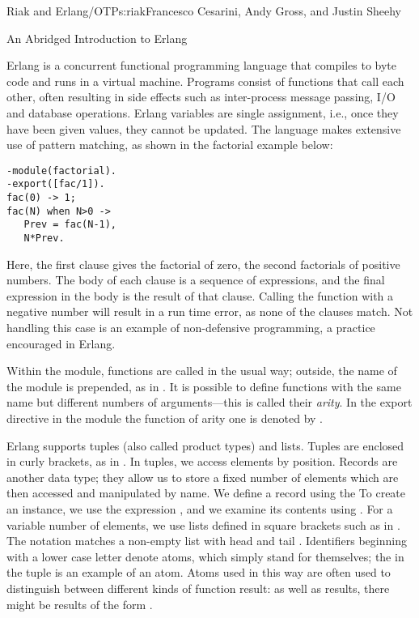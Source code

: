 \begin{aosachapter}{Riak and Erlang/OTP}{s:riak}{Francesco Cesarini, Andy Gross, and Justin Sheehy}
\begin{aosasect1}{An Abridged Introduction to Erlang}

Erlang is a concurrent functional programming language that compiles
to byte code and runs in a virtual machine. Programs consist of
functions that call each other, often resulting in side effects such
as inter-process message passing, I/O and database operations. Erlang
variables are single assignment, i.e., once they have been given
values, they cannot be updated.  The language makes extensive use of
pattern matching, as shown in the factorial example below:

\begin{verbatim}
-module(factorial).
-export([fac/1]).
fac(0) -> 1;
fac(N) when N>0 ->
   Prev = fac(N-1),
   N*Prev.
\end{verbatim}

\noindent Here, the first clause gives the factorial of zero, the second
factorials of positive numbers. The body of each clause is a sequence
of expressions, and the final expression in the body is the result of
that clause. Calling the function with a negative number will result
in a run time error, as none of the clauses match. Not handling this
case is an example of non-defensive programming, a practice encouraged
in Erlang.

Within the module, functions are called in the usual way; outside, the
name of the module is prepended, as in . It
is possible to define functions with the same name but different
numbers of arguments---this is called their \emph{arity}. In the export
directive in the  module the  function of
arity one is denoted by .

Erlang supports tuples (also called product types) and lists. Tuples
are enclosed in curly brackets, as in . In tuples, we
access elements by position. Records are another data type; they allow
us to store a fixed number of elements which are then accessed and
manipulated by name. We define a record using the   To create an instance, we use the
expression , and we examine its contents
using .  For a variable number of elements, we use
lists defined in square brackets such as in \code{{[}23,34{]}}. The
notation \code{{[}X|Xs{]}} matches a non-empty list with head 
and tail . Identifiers beginning with a lower case letter
denote atoms, which simply stand for themselves; the  in the
tuple  is an example of an atom. Atoms used in this
way are often used to distinguish between different kinds of function
result: as well as  results, there might be results of the
form .


\end{aosasect1}
\end{aosachapter}
